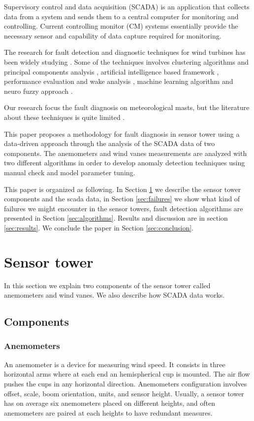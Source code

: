 \documentclass[journal]{IEEEtran}
\begin{document}
Supervisory control and data acquisition (SCADA) is an application that collects data from a system and sends them to a central computer for monitoring and controlling. Current controlling monitor (CM) systems essentially provide the necessary sensor and capability of data capture required for monitoring.

The research for  fault detection and diagnostic techniques for wind turbines has been widely studying  \cite{tchakoua2014wind,wymore2015survey,lu2009review}. Some of the techniques involves
clustering algorithms and principal components analysis \cite{kim2011use}, artificial intelligence based framework \cite{wang2014scada}, performance evaluation and wake analysis \cite{astolfi2016mathematical}, machine learning algorithm \cite{kusiak2011prediction,schlechtingen2011comparative} and neuro fuzzy approach \cite{schlechtingen2012condition}.

Our research focus the fault diagnosis on meteorological masts,   
but the literature about these techniques is quite limited \cite{hasu2006weather} .

This paper proposes a methodology for fault diagnosis in sensor tower using a data-driven approach through the analysis of the SCADA data of two components. The anemometers and wind vanes measurements are analyzed with two different algorithms in order to develop anomaly detection techniques using manual check and model parameter tuning. 

This paper is organized as following. In Section \ref{sec:sensortower} we describe the sensor tower components and the scada data, in Section \ref{sec:failures} we show what kind of failures we might encounter in the sensor towers, fault detection algorithms are presented in Section \ref{sec:algorithms}. Results and discussion are in section \ref{sec:results}. We conclude the paper in Section \ref{sec:conclusion}.

\section{Sensor tower}\label{sec:sensortower}
In this section we explain two components of the sensor tower called anemometers and wind vanes.  We also describe how SCADA data works.
\subsection{Components}
\subsubsection{Anemometers}
An anemometer is a device for measuring wind speed. It consists in three horizontal arms where at each end an hemispherical cup is mounted. The air flow pushes the cups in any horizontal direction. Anemometers configuration involves offset, scale, boom orientation, units, and sensor height. Usually, a sensor tower has on average six anemometers placed on different heights, and often anemometers are paired at each heights to have redundant measures.\cite{clifton2014135}
\end{document}
